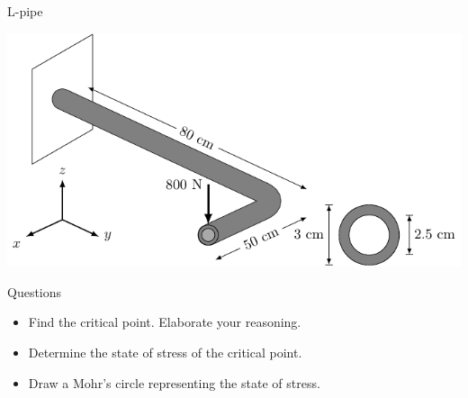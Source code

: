 \documentclass[10pt, svgnames]{beamer}
\begin{document}
\begin{frame}[label={sec:org6061be3}]{L-pipe}
\begin{center}
\includegraphics[width=.9\linewidth]{pictures/l-pipe.pdf}
\end{center}
\end{frame}

\begin{frame}[label={sec:org6dc56f6}]{Questions}
\begin{itemize}
\item Find the critical point. Elaborate your reasoning.
\item Determine the state of stress of the critical point.
\item Draw a Mohr's circle representing the state of stress.
\end{itemize}
\end{frame}
\end{document}
